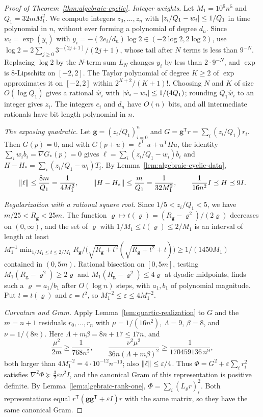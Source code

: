 \begin{proof}[Proof of Theorem~\ref{thm:algebraic-cyclic}]
\emph{Integer weights.} Let $M_1=10^6n^5$ and $Q_1=32mM_1^2$. We compute
integers $z_0,\ldots,z_n$ with $\left\lvert z_i/Q_1-w_i\right\rvert\le1/Q_1$ in time polynomial
in $n$, without ever forming a polynomial of degree $d_n$. Since
$w_i=\exp(y_i)$ with $y_i=-(2e_i/d_n)\log2\in(-2\log2,2\log2)$, use
$\log2=2\sum_{j\ge0}3^{-(2j+1)}/(2j+1)$, whose tail after $N$ terms is less
than $9^{-N}$. Replacing $\log2$ by the $N$-term sum $L_N$ changes $y_i$ by
less than $2\cdot9^{-N}$, and $\exp$ is $8$-Lipschitz on $[-2,2]$. The
Taylor polynomial of degree $K\ge2$ of $\exp$ approximates it on $[-2,2]$
within $2^{K+2}/(K+1)!$. Choosing $N$ and $K$ of size $O(\log Q_1)$ gives a
rational $\hat w_i$ with $\left\lvert\hat w_i-w_i\right\rvert\le1/(4Q_1)$; rounding $Q_1\hat
w_i$ to an integer gives $z_i$. The integers $e_i$ and $d_n$ have $O(n)$ bits,
and all intermediate rationals have bit length polynomial in $n$.

\emph{The exposing quadratic.} Let $\mathbf g=(z_i/Q_1)_{i=0}^n$ and
$G=\mathbf g^{\mathsf T}r=\sum_i(z_i/Q_1)r_i$. Then $G(p)=0$, and with
$G(p+u)=\ell^{\mathsf T}u+u^{\mathsf T}Hu$, the identity
$\sum_iw_ib_i=\nabla G_*(p)=0$ gives $\ell=\sum_i(z_i/Q_1-w_i)b_i$ and
$H-H_*=\sum_i(z_i/Q_1-w_i)T_i$. By Lemma~\ref{lem:algebraic-cyclic-data},
\[
 \left\lVert\ell\right\rVert\le\frac{8m}{Q_1}=\frac1{4M_1^2},\qquad
 \left\lVert H-H_*\right\rVert\le\frac m{Q_1}=\frac1{32M_1^2},\qquad
 \frac1{16n^2}I\preceq H\preceq9I .
\]

\emph{Regularization with a rational square root.} Since $1/5<z_i/Q_1<5$, we
have $m/25<R_{\mathbf g}<25m$. The function
$\varrho\mapsto t(\varrho)=(R_{\mathbf g}-\varrho^2)/(2\varrho)$ decreases on
$(0,\infty)$, and the set of $\varrho$ with $1/M_1\le t(\varrho)\le2/M_1$ is an
interval of length at least
$M_1^{-1}\min_{1/M_1\le t\le2/M_1}R_{\mathbf g}/\bigl(\sqrt{R_{\mathbf
g}+t^2}(\sqrt{R_{\mathbf g}+t^2}+t)\bigr)\ge1/(1450M_1)$ contained in
$(0,5m)$. Rational bisection on $[0,5m]$, testing $M_1(R_{\mathbf
g}-\varrho^2)\ge2\varrho$ and $M_1(R_{\mathbf g}-\varrho^2)\le4\varrho$ at
dyadic midpoints, finds such a $\varrho=a_1/b_1$ after $O(\log n)$ steps, with
$a_1,b_1$ of polynomial magnitude. Put $t=t(\varrho)$ and $\varepsilon=t^2$,
so $M_1^{-2}\le\varepsilon\le4M_1^{-2}$.

\emph{Curvature and Gram.} Apply Lemma~\ref{lem:quartic-realization} to $G$ and
the $m=n+1$ residuals $r_0,\ldots,r_n$ with $\mu=1/(16n^2)$, $\Lambda=9$,
$\beta=8$, and $\nu=1/(8n)$. Here $\Lambda+m\beta=8n+17\le17n$, and
\[
 \frac{\mu^2}{2m}\ge\frac1{768n^5},\qquad
 \frac{\nu^2\mu^2}{36n(\Lambda+m\beta)^2}\ge\frac1{170459136\,n^9},
\]
both larger than $4M_1^{-2}=4\cdot10^{-12}n^{-10}$; also
$\left\lVert\ell\right\rVert\le\varepsilon/4$. Thus $\Phi=G^2+\varepsilon\sum_ir_i^2$ satisfies
$\nabla^2\Phi\succeq\frac32\varepsilon\nu^2I$, and the canonical Gram of this
representation is positive definite. By Lemma~\ref{lem:algebraic-rank-one},
$\Phi=\sum_i(L_\varrho r)_i^2$. Both representations equal
$r^{\mathsf T}(\mathbf g\mathbf g^{\mathsf T}+\varepsilon I)r$ with the same
matrix, so they have the same canonical Gram.


\end{proof}
